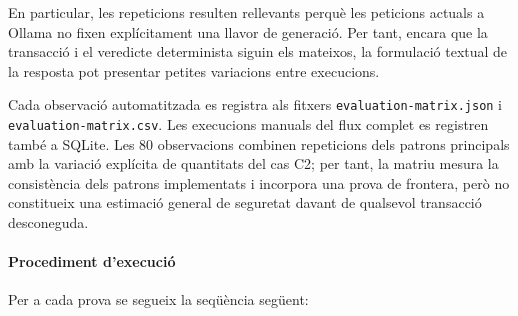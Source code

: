 En particular, les repeticions resulten rellevants perquè les peticions actuals a Ollama no fixen explícitament una llavor de generació. Per tant, encara que la transacció i el veredicte determinista siguin els mateixos, la formulació textual de la resposta pot presentar petites variacions entre execucions.

Cada observació automatitzada es registra als fitxers \texttt{evaluation-matrix.json} i \texttt{evaluation-matrix.csv}. Les execucions manuals del flux complet es registren també a SQLite. Les 80 observacions combinen repeticions dels patrons principals amb la variació explícita de quantitats del cas C2; per tant, la matriu mesura la consistència dels patrons implementats i incorpora una prova de frontera, però no constitueix una estimació general de seguretat davant de qualsevol transacció desconeguda.

\paragraph{Procediment d'execució}

Per a cada prova se segueix la seqüència següent:

